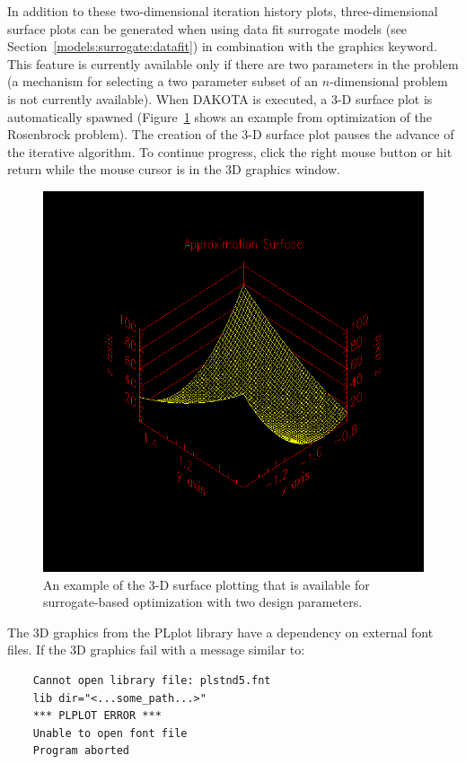 In addition to these two-dimensional iteration history plots,
three-dimensional surface plots can be generated when using data fit
surrogate models (see Section~\ref{models:surrogate:datafit}) in
combination with the graphics keyword. This feature is currently
available only if there are two parameters in the problem (a mechanism
for selecting a two parameter subset of an $n$-dimensional problem is
not currently available).  When DAKOTA is executed, a 3-D surface plot
is automatically spawned (Figure~\ref{output:3dcont} shows an example
from optimization of the Rosenbrock problem). The creation of the 3-D
surface plot pauses the advance of the iterative algorithm.  To
continue progress, click the right mouse button or hit return while
the mouse cursor is in the 3D graphics window.
\begin{figure}
  \centering
  \includegraphics[scale=0.65]{images/sbo_3d_surface}
  \caption{An example of the 3-D surface plotting that is available
    for surrogate-based optimization with two design parameters.}
  \label{output:3dcont}
\end{figure}

The 3D graphics from the PLplot library have a dependency on external
font files. If the 3D graphics fail with a message similar to:
\begin{small}
\begin{verbatim}
    Cannot open library file: plstnd5.fnt
    lib dir="<...some_path...>"
    *** PLPLOT ERROR ***
    Unable to open font file
    Program aborted
\end{verbatim}
\end{small}

